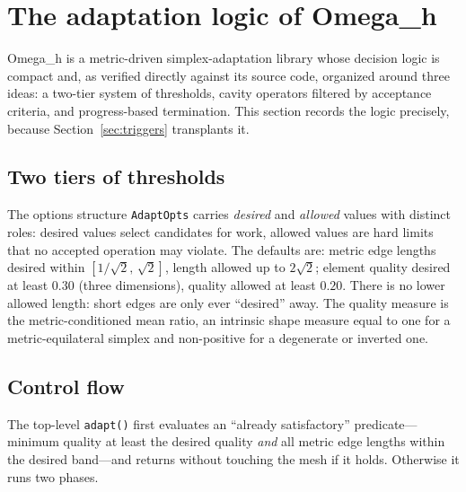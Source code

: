 \documentclass[11pt]{article}
\newcommand{\code}[1]{\texttt{#1}}
\newcommand{\omegah}{Omega\_h}
\begin{document}
\section{The adaptation logic of \omegah{}}
\label{sec:omegah}

\omegah{} \cite{omegah,ibanez2016} is a metric-driven simplex-adaptation
library whose decision logic is compact and, as verified directly against
its source code, organized around three ideas: a two-tier system of
thresholds, cavity operators filtered by acceptance criteria, and
progress-based termination. This section records the logic precisely,
because Section~\ref{sec:triggers} transplants it.

\subsection{Two tiers of thresholds}

The options structure \code{AdaptOpts} carries \emph{desired} and
\emph{allowed} values with distinct roles: desired values select
candidates for work, allowed values are hard limits that no accepted
operation may violate. The defaults are: metric edge lengths desired
within $[1/\sqrt{2},\,\sqrt{2}]$, length allowed up to $2\sqrt{2}$;
element quality desired at least $0.30$ (three dimensions), quality
allowed at least $0.20$. There is no lower allowed length: short edges
are only ever ``desired'' away. The quality measure is the
metric-conditioned mean ratio, an intrinsic shape measure equal to one
for a metric-equilateral simplex and non-positive for a degenerate or
inverted one.

\subsection{Control flow}

The top-level \code{adapt()} first evaluates an ``already satisfactory''
predicate---minimum quality at least the desired quality \emph{and} all
metric edge lengths within the desired band---and returns without
touching the mesh if it holds. Otherwise it runs two phases.
\end{document}
